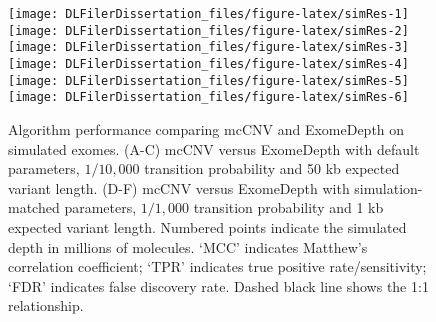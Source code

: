 \documentclass[11pt,letterpaper,oneside]{book}
\begin{document}
\begin{figure}

{\centering \texttt{[image: DLFilerDissertation\_files/figure-latex/simRes-1]} \texttt{[image: DLFilerDissertation\_files/figure-latex/simRes-2]} \texttt{[image: DLFilerDissertation\_files/figure-latex/simRes-3]} \texttt{[image: DLFilerDissertation\_files/figure-latex/simRes-4]} \texttt{[image: DLFilerDissertation\_files/figure-latex/simRes-5]} \texttt{[image: DLFilerDissertation\_files/figure-latex/simRes-6]} 

}

\caption[Algorithm performance comparing mcCNV and ExomeDepth on simulated exomes.]{Algorithm performance comparing mcCNV and ExomeDepth on simulated exomes. (A-C) mcCNV versus ExomeDepth with default parameters, \(1/10,000\) transition probability and 50 kb expected variant length. (D-F) mcCNV versus ExomeDepth with simulation-matched parameters, \(1/1,000\) transition probability and 1 kb expected variant length. Numbered points indicate the simulated depth in millions of molecules. `MCC' indicates Matthew's correlation coefficient; `TPR' indicates true positive rate/sensitivity; `FDR' indicates false discovery rate. Dashed black line shows the 1:1 relationship.}\label{fig:simRes}
\end{figure}
\end{document}

